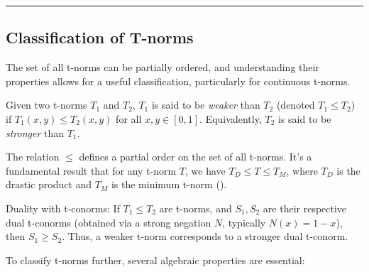 \noindent\rule{\textwidth}{2pt}


\subsection{Classification of T-norms}


The set of all t-norms can be partially ordered, and understanding their properties allows for a useful classification, particularly for continuous t-norms.

\begin{definition}
  Given two t-norms $T_1$ and $T_2$, $T_1$ is said to be \emph{weaker} than $T_2$ (denoted $T_1 \leq T_2$) if $T_1(x,y) \leq T_2(x,y)$ for all $x,y \in [0,1]$.
  Equivalently, $T_2$ is said to be \emph{stronger} than $T_1$.
\end{definition}

\begin{remark}
  The relation $\leq$ defines a partial order on the set of all t-norms.
  It's a fundamental result that for any t-norm $T$, we have $T_D \leq T \leq T_M$, where $T_D$ is the drastic product and $T_M$ is the minimum t-norm (\citep[Remark 1.5(i), p.~21]{Klement2000}).
\end{remark}

\begin{remark}
  Duality with t-conorms: If $T_1 \leq T_2$ are t-norms, and $S_1, S_2$ are their respective dual t-conorms (obtained via a strong negation $N$, typically $N(x)=1-x$), then $S_1 \geq S_2$. Thus, a weaker t-norm corresponds to a stronger dual t-conorm.
\end{remark}

To classify t-norms further, several algebraic properties are essential:


